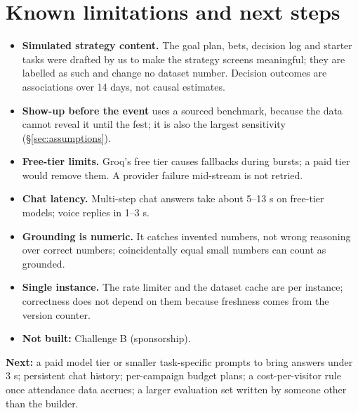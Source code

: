 \documentclass[11pt,a4paper]{article}
\begin{document}
\section{Known limitations and next steps}\label{sec:limits}
\begin{itemize}
  \item \textbf{Simulated strategy content.} The goal plan, bets, decision log and starter tasks were drafted by us to make the strategy screens meaningful; they are labelled as such and change no dataset number. Decision outcomes are associations over 14 days, not causal estimates.
  \item \textbf{Show-up before the event} uses a sourced benchmark, because the data cannot reveal it until the fest; it is also the largest sensitivity (\S\ref{sec:assumptions}).
  \item \textbf{Free-tier limits.} Groq's free tier causes fallbacks during bursts; a paid tier would remove them. A provider failure mid-stream is not retried.
  \item \textbf{Chat latency.} Multi-step chat answers take about 5--13 s on free-tier models; voice replies in 1--3 s.
  \item \textbf{Grounding is numeric.} It catches invented numbers, not wrong reasoning over correct numbers; coincidentally equal small numbers can count as grounded.
  \item \textbf{Single instance.} The rate limiter and the dataset cache are per instance; correctness does not depend on them because freshness comes from the version counter.
  \item \textbf{Not built:} Challenge B (sponsorship).
\end{itemize}
\textbf{Next:} a paid model tier or smaller task-specific prompts to bring answers under 3 s; persistent chat history; per-campaign budget plans; a cost-per-visitor rule once attendance data accrues; a larger evaluation set written by someone other than the builder.

\end{document}
